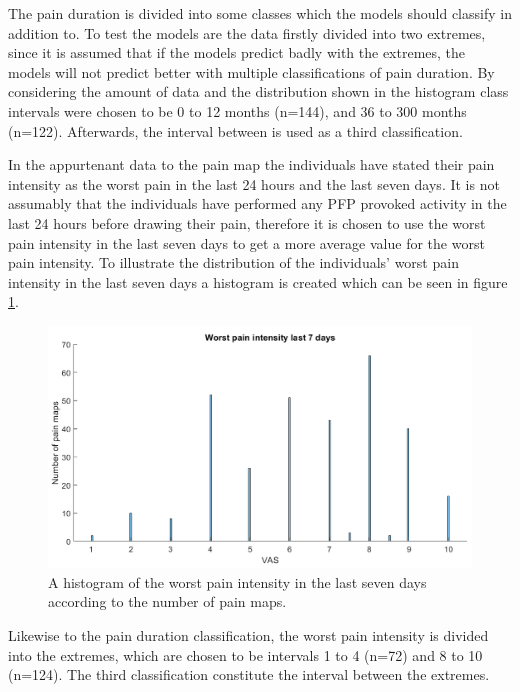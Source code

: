 \noindent
The pain duration is divided into some classes which the models should classify in addition to. To test the models are the data firstly divided into two extremes, since it is assumed that if the models predict badly with the extremes, the models will not predict better with multiple classifications of pain duration. 
By considering the amount of data and the distribution shown in the histogram class intervals were chosen to be 0 to 12 months (n=144), and 36 to 300 months (n=122). Afterwards, the interval between is used as a third classification. \newline

\noindent
In the appurtenant data to the pain map the individuals have stated their pain intensity as the worst pain in the last 24 hours and the last seven days.
It is not assumably that the individuals have performed any PFP provoked activity in the last 24 hours before drawing their pain, therefore it is chosen to use the worst pain intensity in the last seven days to get a more average value for the worst pain intensity.
To illustrate the distribution of the individuals’ worst pain intensity in the last seven days a histogram is created which can be seen in figure \ref{fig:histopain}.

\begin{figure} [H]
\centering
\includegraphics[width=1\textwidth]{figures/histrogramPain}
\caption{A histogram of the worst pain intensity in the last seven days according to the number of pain maps. }
\label{fig:histopain}
\end{figure}

\noindent
Likewise to the pain duration classification, the worst pain intensity is divided into the extremes, which are chosen to be intervals 1 to 4 (n=72) and 8 to 10 (n=124). The third classification constitute the interval between the extremes.


